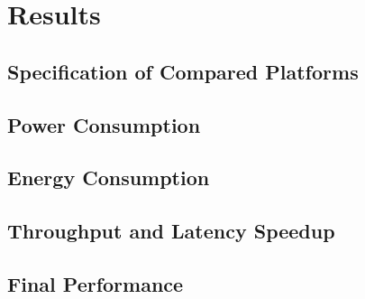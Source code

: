 \chapter{Results}
\label{Chapter-Results}

\section{Specification of Compared Platforms}
\section{Power Consumption}
\section{Energy Consumption}
\section{Throughput and Latency Speedup}
\section{Final Performance}
